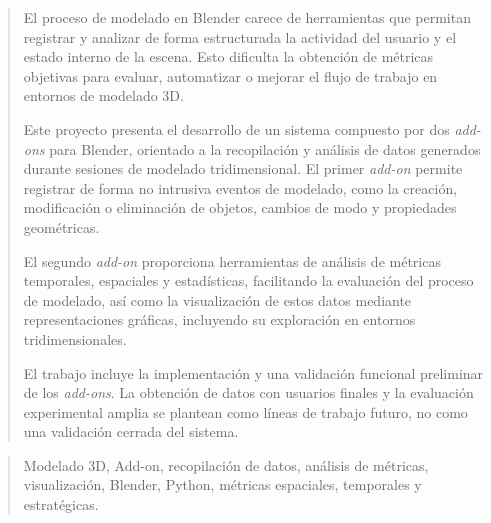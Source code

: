 \documentclass[a4paper,12pt,twoside]{memoir}
\begin{document}





\newpage\null\thispagestyle{empty}\newpage




\frontmatter

\renewcommand*\abstractname{Resumen}
\begin{abstract}

El proceso de modelado en Blender carece de herramientas que permitan registrar y analizar de forma estructurada la actividad del usuario y el estado interno de la escena. Esto dificulta la obtención de métricas objetivas para evaluar, automatizar o mejorar el flujo de trabajo en entornos de modelado 3D.


Este proyecto presenta el desarrollo de un sistema compuesto por dos \textit{add-ons} para Blender, orientado a la recopilación y análisis de datos generados durante sesiones de modelado tridimensional. El primer \textit{add-on} permite registrar de forma no intrusiva eventos de modelado, como la creación, modificación o eliminación de objetos, cambios de modo y propiedades geométricas.


El segundo \textit{add-on} proporciona herramientas de análisis de métricas temporales, espaciales y estadísticas, facilitando la evaluación del proceso de modelado, así como la visualización de estos datos mediante representaciones gráficas, incluyendo su exploración en entornos tridimensionales.


El trabajo incluye la implementación y una validación funcional preliminar de los \textit{add-ons}. La obtención de datos con usuarios finales y la evaluación experimental amplia se plantean como líneas de trabajo futuro, no como una validación cerrada del sistema.

\end{abstract}

\renewcommand*\abstractname{Descriptores}
\begin{abstract}

Modelado 3D, Add-on, recopilación de datos, análisis de métricas, visualización, Blender, Python, métricas espaciales, temporales y estratégicas.


\end{abstract}
\end{document}
